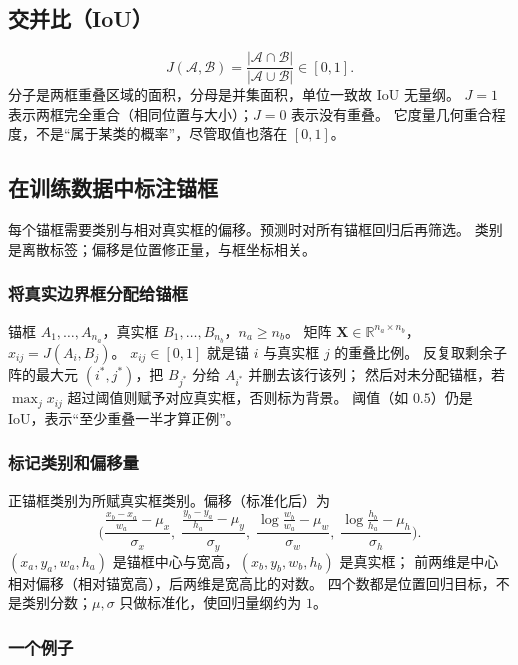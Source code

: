 \subsection{交并比（IoU）}

\[
J(\mathcal{A},\mathcal{B})
=
\frac{|\mathcal{A}\cap\mathcal{B}|}{|\mathcal{A}\cup\mathcal{B}|}\in[0,1].
\]
分子是两框重叠区域的面积，分母是并集面积，单位一致故 IoU 无量纲。
$J=1$ 表示两框完全重合（相同位置与大小）；$J=0$ 表示没有重叠。
它度量几何重合程度，不是“属于某类的概率”，尽管取值也落在 $[0,1]$。

\subsection{在训练数据中标注锚框}

每个锚框需要类别与相对真实框的偏移。预测时对所有锚框回归后再筛选。
类别是离散标签；偏移是位置修正量，与框坐标相关。

\subsubsection{将真实边界框分配给锚框}

锚框 $A_1,\ldots,A_{n_a}$，真实框 $B_1,\ldots,B_{n_b}$，$n_a\geq n_b$。
矩阵 $\bm{X}\in\mathbb{R}^{n_a\times n_b}$，$x_{ij}=J(A_i,B_j)$。
$x_{ij}\in[0,1]$ 就是锚 $i$ 与真实框 $j$ 的重叠比例。
反复取剩余子阵的最大元 $(i^{\ast},j^{\ast})$，把 $B_{j^{\ast}}$ 分给 $A_{i^{\ast}}$ 并删去该行该列；
然后对未分配锚框，若 $\max_j x_{ij}$ 超过阈值则赋予对应真实框，否则标为背景。
阈值（如 $0.5$）仍是 IoU，表示“至少重叠一半才算正例”。

\subsubsection{标记类别和偏移量}

正锚框类别为所赋真实框类别。偏移（标准化后）为
\[
\Biggl(
\frac{\frac{x_b-x_a}{w_a}-\mu_x}{\sigma_x},\;
\frac{\frac{y_b-y_a}{h_a}-\mu_y}{\sigma_y},\;
\frac{\log\frac{w_b}{w_a}-\mu_w}{\sigma_w},\;
\frac{\log\frac{h_b}{h_a}-\mu_h}{\sigma_h}
\Biggr).
\]
$(x_a,y_a,w_a,h_a)$ 是锚框中心与宽高，$(x_b,y_b,w_b,h_b)$ 是真实框；
前两维是中心相对偏移（相对锚宽高），后两维是宽高比的对数。
四个数都是位置回归目标，不是类别分数；$\mu,\sigma$ 只做标准化，使回归量纲约为 $1$。

\subsubsection{一个例子}

